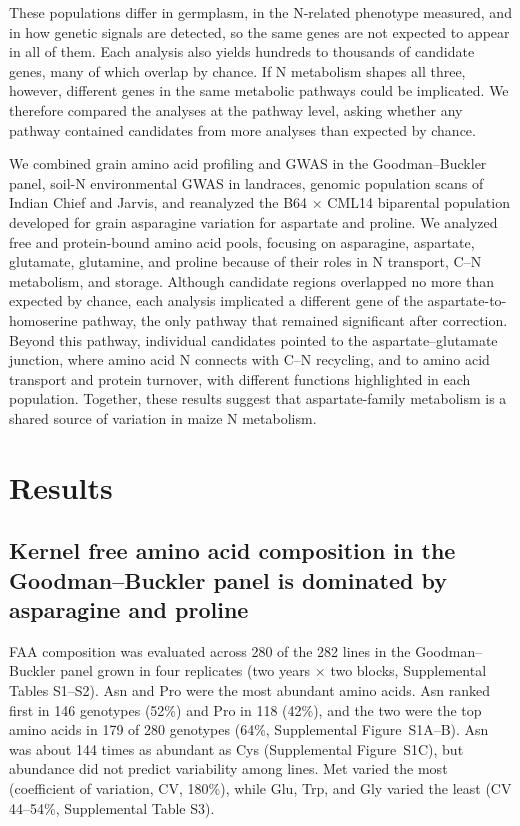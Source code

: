\documentclass[namedate,unnumsec,webpdf,contemporary,large]{oup-authoring-template}
\begin{document}
These populations differ in germplasm, in the N-related phenotype measured, and in how genetic signals are detected, so the same genes are not expected to appear in all of them. Each analysis also yields hundreds to thousands of candidate genes, many of which overlap by chance. If N metabolism shapes all three, however, different genes in the same metabolic pathways could be implicated. We therefore compared the analyses at the pathway level, asking whether any pathway contained candidates from more analyses than expected by chance.

We combined grain amino acid profiling and GWAS in the Goodman--Buckler panel, soil-N environmental GWAS in landraces, genomic population scans of Indian Chief and Jarvis, and reanalyzed the B64 $\times$ CML14 biparental population developed for grain asparagine variation for aspartate and proline. We analyzed free and protein-bound amino acid pools, focusing on asparagine, aspartate, glutamate, glutamine, and proline because of their roles in N transport, C--N metabolism, and storage. Although candidate regions overlapped no more than expected by chance, each analysis implicated a different gene of the aspartate-to-homoserine pathway, the only pathway that remained significant after correction. Beyond this pathway, individual candidates pointed to the aspartate--glutamate junction, where amino acid N connects with C--N recycling, and to amino acid transport and protein turnover, with different functions highlighted in each population. Together, these results suggest that aspartate-family metabolism is a shared source of variation in maize N metabolism.

\section{Results}

\subsection{Kernel free amino acid composition in the Goodman--Buckler panel is dominated by asparagine and proline}

FAA composition was evaluated across 280 of the 282 lines in the Goodman--Buckler panel grown in four replicates (two years $\times$ two blocks, Supplemental Tables S1--S2). Asn and Pro were the most abundant amino acids. Asn ranked first in 146 genotypes (52\%) and Pro in 118 (42\%), and the two were the top amino acids in 179 of 280 genotypes (64\%, Supplemental Figure~S1A--B). Asn was about 144 times as abundant as Cys (Supplemental Figure~S1C), but abundance did not predict variability among lines. Met varied the most (coefficient of variation, CV, 180\%), while Glu, Trp, and Gly varied the least (CV 44--54\%, Supplemental Table S3).
\end{document}
